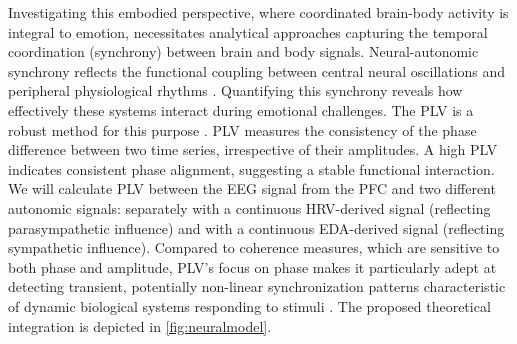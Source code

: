 \documentclass[12pt]{article} %
\begin{document}
Investigating this embodied perspective, where coordinated brain-body activity is integral to emotion, necessitates analytical approaches capturing the temporal coordination (synchrony) between brain and body signals. Neural-autonomic synchrony reflects the functional coupling between central neural oscillations and peripheral physiological rhythms \parencite{thayerHeartRateVariability2009}. Quantifying this synchrony reveals how effectively these systems interact during emotional challenges. The \gls{PLV} is a robust method for this purpose \parencite{lachauxMeasuringPhaseSynchrony1999}. \gls{PLV} measures the consistency of the phase difference between two time series, irrespective of their amplitudes. A high \gls{PLV} indicates consistent phase alignment, suggesting a stable functional interaction. We will calculate \gls{PLV} between the \gls{EEG} signal from the \gls{PFC} and two different autonomic signals: separately with a continuous \gls{HRV}-derived signal (reflecting parasympathetic influence) and with a continuous \gls{EDA}-derived signal (reflecting sympathetic influence). Compared to coherence measures, which are sensitive to both phase and amplitude, \gls{PLV}'s focus on phase makes it particularly adept at detecting transient, potentially non-linear synchronization patterns characteristic of dynamic biological systems responding to stimuli \parencite{cohenAnalyzingNeuralTime2014, valenzaRevealingRealTimeEmotional2014}. The proposed theoretical integration is depicted in \autoref{fig:neuralmodel}.\\
\end{document}
